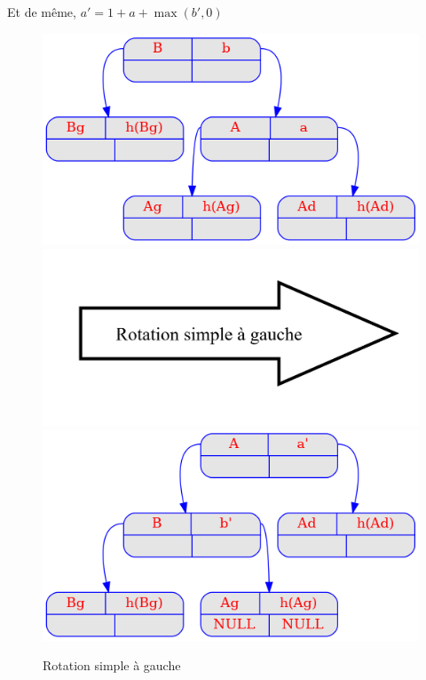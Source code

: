 \documentclass{article} %
\begin{document}
Et de même, \( a' = 1 + a + \max(b', 0) \)

\begin{figure}[!h]
\begin{center}
\includegraphics[scale=0.35]{Img_prog1/LeftRotate1.png}
\includegraphics[scale=0.20]{Img_prog1/FlecheLeftrotate.png}
\includegraphics[scale=0.35]{Img_prog1/LeftRotate2.png}
\end{center}

\caption{Rotation simple à gauche}
\label{LeftRot}
\end{figure}
\end{document}
